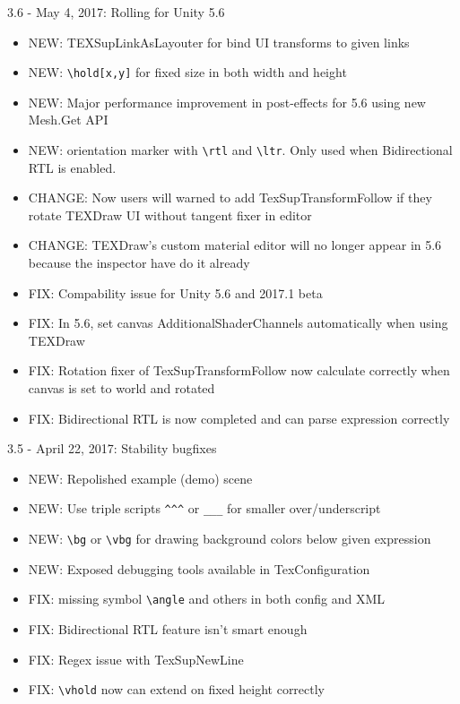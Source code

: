 \documentclass[12pt]{article}
\begin{document}
3.6 - May 4, 2017: Rolling for Unity 5.6
\begin{itemize}
\item NEW: TEXSupLinkAsLayouter for bind UI transforms to given links
\item NEW: \verb|\hold[x,y]| for fixed size in both width and height
\item NEW: Major performance improvement in post-effects for 5.6 using new Mesh.Get API
\item NEW: orientation marker with \verb|\rtl| and \verb|\ltr|. Only used when Bidirectional RTL is enabled.
\item CHANGE: Now users will warned to add TexSupTransformFollow if they rotate TEXDraw UI without tangent fixer in editor
\item CHANGE: TEXDraw's custom material editor will no longer appear in 5.6 because the inspector have do it already
\item FIX: Compability issue for Unity 5.6 and 2017.1 beta
\item FIX: In 5.6, set canvas AdditionalShaderChannels automatically when using TEXDraw
\item FIX: Rotation fixer of TexSupTransformFollow now calculate correctly when canvas is set to world and rotated
\item FIX: Bidirectional RTL is now completed and can parse expression correctly
\end{itemize}

3.5 - April 22, 2017: Stability bugfixes
\begin{itemize}
\item NEW: Repolished example (demo) scene
\item NEW: Use triple scripts \verb|^^^| or \verb|___| for smaller over/underscript
\item NEW: \verb|\bg| or \verb|\vbg| for drawing background colors below given expression
\item NEW: Exposed debugging tools available in TexConfiguration
\item FIX: missing symbol \verb|\angle| and others in both config and XML
\item FIX: Bidirectional RTL feature isn't smart enough
\item FIX: Regex issue with TexSupNewLine
\item FIX: \verb|\vhold| now can extend on fixed height correctly
\end{itemize}
\end{document}
